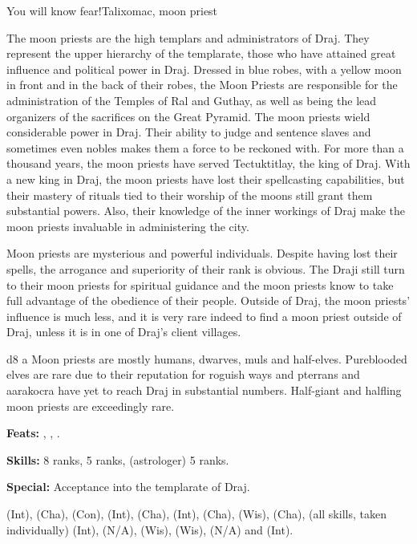 {You will know fear!}{Talixomac, moon priest}
{The moon priests are the high templars and administrators of Draj. They represent the upper hierarchy of the templarate, those who have attained great influence and political power in Draj. Dressed in blue robes, with a yellow moon in front and in the back of their robes, the Moon Priests are responsible for the administration of the Temples of Ral and Guthay, as well as being the lead organizers of the sacrifices on the Great Pyramid. The moon priests wield considerable power in Draj. Their ability to judge and sentence slaves and sometimes even nobles makes them a force to be reckoned with. For more than a thousand years, the moon priests have served Tectuktitlay, the king of Draj. With a new king in Draj, the moon priests have lost their spellcasting capabilities, but their mastery of rituals tied to their worship of the moons still grant them substantial powers. Also, their knowledge of the inner workings of Draj make the moon priests invaluable in administering the city.

Moon priests are mysterious and powerful individuals. Despite having lost their spells, the arrogance and superiority of their rank is obvious. The Draji still turn to their moon priests for spiritual guidance and the moon priests know to take full advantage of the obedience of their people. Outside of Draj, the moon priests' influence is much less, and it is very rare indeed to find a moon priest outside of Draj, unless it is in one of Draj's client villages.}
{d8}
{a}
{Moon priests are mostly humans, dwarves, muls and half-elves. Pureblooded elves are rare due to their reputation for roguish ways and pterrans and aarakocra have yet to reach Draj in substantial numbers. Half-giant and halfling moon priests are exceedingly rare.}
{
\textbf{Feats:} , , .

\textbf{Skills:}  8 ranks,  5 ranks,  (astrologer) 5 ranks.

\textbf{Special:} Acceptance into the templarate of Draj.
}
{
 (Int),  (Cha),  (Con),  (Int),  (Cha),  (Int),  (Cha),  (Wis),  (Cha),  (all skills, taken individually) (Int),  (N/A),  (Wis),  (Wis),  (N/A) and  (Int).
}

